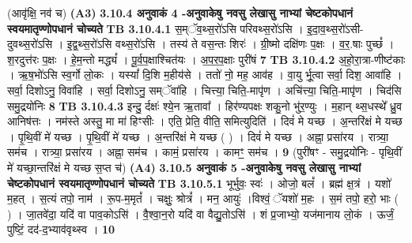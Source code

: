 \documentclass[17pt]{extarticle}
\begin{document}
{{{{{{{{{{{{{{{{{{{{{{                  \newline
                                    (आवृ॑क्षि॒ नव॑ च) \textbf{(A3)} \newline \newline
                \textbf{ 3.10.4    अनुवाकं   4 -अनुवाकेषु नवसु लेखासु नाभ्यां चेष्टकोपधानं स्वयमातृण्णोपधानं चोच्यते} \newline
                                \textbf{ TB 3.10.4.1} \newline
                  स॒म्ॅव॒थ्स॒रो॑ऽसि परिवथ्स॒रो॑ऽसि । इ॒दा॒व॒थ्स॒रो॑ऽसी-दुवथ्स॒रो॑ऽसि । इ॒द्व॒थ्स॒रो॑ऽसि वथ्स॒रो॑ऽसि । तस्य॑ ते वस॒न्तः शिरः॑ । ग्री॒ष्मो दक्षि॑णः प॒क्षः । व॒र॒.षाः पुच्छं᳚ । श॒रदुत्त॑रः प॒क्षः । हे॒म॒न्तो मद्ध्यं᳚ । पू॒र्व॒प॒क्षाश्चित॑यः । अ॒प॒र॒प॒क्षाः पुरी॑षं \textbf{ 7} \newline
                  \newline
                                \textbf{ TB 3.10.4.2} \newline
                  अ॒हो॒रा॒त्रा-णीष्ट॑काः । ऋ॒ष॒भो॑ऽसि स्व॒र्गो लो॒कः । यस्यां᳚ दि॒शि म॒हीय॑से । ततो॑ नो॒ मह॒ आव॑ह । वा॒यु र्भू॒त्वा सर्वा॒ दिश॒ आवा॑हि । सर्वा॒ दिशोऽनु॒ विवा॑हि । सर्वा॒ दिशोऽनु॒ सम्ॅवा॑हि । चित्त्या॒ चिति॒-मापृ॑ण । अचि॑त्त्या॒ चिति॒-मापृ॑ण । चिद॑सि समु॒द्रयो॑निः \textbf{ 8} \newline
                  \newline
                                \textbf{ TB 3.10.4.3} \newline
                  इन्दु॒ र्दक्षः॑ श्ये॒न ऋ॒तावा᳚ । हिर॑ण्यपक्षः शकु॒नो भु॑र॒ण्युः । म॒हान् थ्स॒धस्थे᳚ ध्रु॒व आनिष॑त्तः । नम॑स्ते अस्तु॒ मा मा॑ हिꣳसीः । एति॒ प्रेति॒ वीति॒ समित्युदिति॑ । दिवं॑ मे यच्छ । अ॒न्तरि॑क्षं मे यच्छ । पृ॒थि॒वीं मे॑ यच्छ । पृ॒थि॒वीं मे॑ यच्छ । अ॒न्तरि॑क्षं मे यच्छ ( ) । दिवं॑ मे यच्छ । अह्ना॒ प्रसा॑रय । रात्र्या॒ सम॑च । रात्र्या॒ प्रसा॑रय । अह्ना॒ सम॑च । कामं॒ प्रसा॑रय । कामꣳ॒॒ सम॑च । \textbf{ 9} \newline
                  \newline
                                    (पुरी॑षꣳ - समु॒द्रयो॑निः - पृथि॒वीं मे॑ यच्छा॒न्तरि॑क्षं मे यच्छ स॒प्त च॑) \textbf{(A4)} \newline \newline
                \textbf{ 3.10.5    अनुवाकं   5 -अनुवाकेषु नवसु लेखासु नाभ्यां चेष्टकोपधानं स्वयमातृण्णोपधानं चोच्यते} \newline
                                \textbf{ TB 3.10.5.1} \newline
                  भूर्भुवः॒ स्वः॑ । ओजो॒ बलं᳚ । ब्रह्म॑ क्ष॒त्रं । यशो॑ म॒हत् । स॒त्यं तपो॒ नाम॑ । रू॒प-म॒मृतं᳚ । चक्षुः॒ श्रोत्रं᳚ । मन॒ आयुः॑ ।विश्वं॒ ॅयशो॑ म॒हः । स॒मं तपो॒ हरो॒ भाः ( ) । जा॒तवे॑दा॒ यदि॑ वा पाव॒कोऽसि॑ । वै॒श्वा॒न॒रो यदि॑ वा वैद्यु॒तोऽसि॑ । शं प्र॒जाभ्यो॒ यज॑मानाय लो॒कं । ऊर्जं॒ पुष्टिं॒ दद॑-द॒भ्याव॑वृथ्स्व । \textbf{ 10} \newline
}}}}}}}}}}}}}}}}}}}}}}
\end{document}
